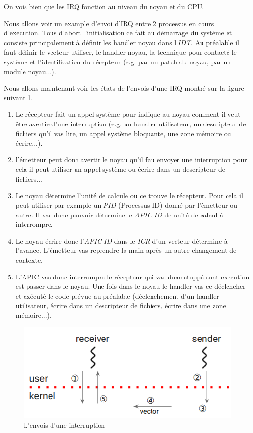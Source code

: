 On vois bien que les IRQ fonction au niveau du noyau et du CPU.

Nous allons voir un example d'envoi d'IRQ entre 2 processus en cours d'execution.
Tous d'abort l'initialisation ce fait au démarrage du système et consiste principalement à définir les handler noyau dans l'\emph{IDT}.
Au préalable il faut définir le vecteur utiliser, le handler noyau, la technique pour contacté le système et l'identification du récepteur (e.g. par un patch du noyau, par un module noyau...).

Nous allons maintenant voir les états de l'envois d'une IRQ montré sur la figure suivant \ref{fig:sendInt}.

\begin{enumerate}[label=\protect\circled{\arabic*}]
  \item Le récepteur fait un appel système pour indique au noyau comment il veut être avertie d'une interruption (e.g. un handler utilisateur, un descripteur de fichiers qu'il vas lire, un appel système bloquante, une zone mémoire ou écrire...).
  \item l'émetteur peut donc avertir le noyau qu'il fau envoyer une interruption pour cela il peut utiliser un appel système ou écrire dans un descripteur de fichiers...
  \item Le noyau détermine l'unité de calcule ou ce trouve le récepteur. Pour cela il peut utiliser par example un \emph{PID} (Processus ID) donné par l'émetteur ou autre.
  Il vas donc pouvoir détermine le \emph{APIC ID} de unité de calcul à interrompre.
  \item Le noyau écrire donc l'\emph{APIC ID} dans le \emph{ICR} d'un vecteur détermine à l'avance. L'émetteur vas reprendre la main après un autre changement de contexte.
  \item L'APIC vas donc interrompre le récepteur qui vas donc stoppé sont execution est passer dans le noyau.
  Une fois dans le noyau le handler vas ce déclencher et exécuté le code prévue au préalable (déclenchement d'un handler utilisateur, écrire dans un descripteur de fichiers, écrire dans une zone mémoire...).
\end{enumerate}

\begin{figure}[H]
  \includegraphics[width=\textwidth]{images/interruptSend.png}
  \caption{L'envois d'une interruption}
  \label{fig:sendInt}
\end{figure}

